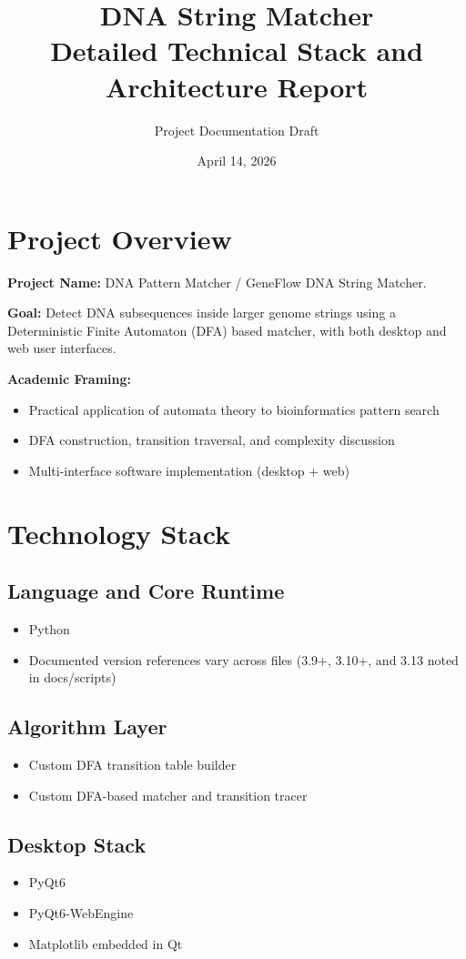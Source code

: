 \documentclass[11pt]{article}
\title{DNA String Matcher\\Detailed Technical Stack and Architecture Report}
\author{Project Documentation Draft}
\date{April 14, 2026}
\begin{document}
\maketitle
\tableofcontents
\newpage

\section{Project Overview}
\textbf{Project Name:} DNA Pattern Matcher / GeneFlow DNA String Matcher.

\textbf{Goal:} Detect DNA subsequences inside larger genome strings using a Deterministic Finite Automaton (DFA) based matcher, with both desktop and web user interfaces.

\textbf{Academic Framing:}
\begin{itemize}[leftmargin=*]
  \item Practical application of automata theory to bioinformatics pattern search
  \item DFA construction, transition traversal, and complexity discussion
  \item Multi-interface software implementation (desktop + web)
\end{itemize}

\section{Technology Stack}
\subsection{Language and Core Runtime}
\begin{itemize}[leftmargin=*]
  \item Python
  \item Documented version references vary across files (3.9+, 3.10+, and 3.13 noted in docs/scripts)
\end{itemize}

\subsection{Algorithm Layer}
\begin{itemize}[leftmargin=*]
  \item Custom DFA transition table builder
  \item Custom DFA-based matcher and transition tracer
\end{itemize}

\subsection{Desktop Stack}
\begin{itemize}[leftmargin=*]
  \item PyQt6
  \item PyQt6-WebEngine
  \item Matplotlib embedded in Qt
\end{itemize}
\end{document}
